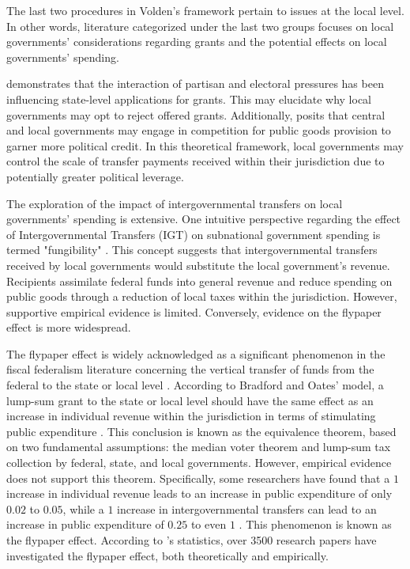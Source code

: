 \documentclass[man]{apa7}
\begin{document}
The last two procedures in Volden's framework pertain to issues at the local level. In other words, literature categorized under the last two groups focuses on local governments' considerations regarding grants and the potential effects on local governments' spending.

\Textcite{nicholson2012leaving} demonstrates that the interaction of partisan and electoral pressures has been influencing state-level applications for grants. This may elucidate why local governments may opt to reject offered grants. Additionally, \Textcite{volden2005intergovernmental} posits that central and local governments may engage in competition for public goods provision to garner more political credit. In this theoretical framework, local governments may control the scale of transfer payments received within their jurisdiction due to potentially greater political leverage.

The exploration of the impact of intergovernmental transfers on local governments' spending is extensive. One intuitive perspective regarding the effect of Intergovernmental Transfers (IGT) on subnational government spending is termed "fungibility" \parencite{pack1993foreign}. This concept suggests that intergovernmental transfers received by local governments would substitute the local government's revenue. Recipients assimilate federal funds into general revenue and reduce spending on public goods through a reduction of local taxes within the jurisdiction. However, supportive empirical evidence is limited. Conversely, evidence on the flypaper effect is more widespread.

The flypaper effect is widely acknowledged as a significant phenomenon in the fiscal federalism literature concerning the vertical transfer of funds from the federal to the state or local level \parencite{hines1995anomalies,gamkhar2007impact}. According to Bradford and Oates' model, a lump-sum grant to the state or local level should have the same effect as an increase in individual revenue within the jurisdiction in terms of stimulating public expenditure \parencite{bradford1971analysis}. This conclusion is known as the equivalence theorem, based on two fundamental assumptions: the median voter theorem and lump-sum tax collection by federal, state, and local governments. However, empirical evidence does not support this theorem. Specifically, some researchers have found that a $1$ increase in individual revenue leads to an increase in public expenditure of only $0.02$ to $0.05$, while a $1$ increase in intergovernmental transfers can lead to an increase in public expenditure of $0.25$ to even $1$ \parencite{bailey1998flypaper,dollery1996empirical,gamkhar2007impact}. This phenomenon is known as the flypaper effect. According to \Textcite{inman2008flypaper}'s statistics, over 3500 research papers have investigated the flypaper effect, both theoretically and empirically.
\end{document}
